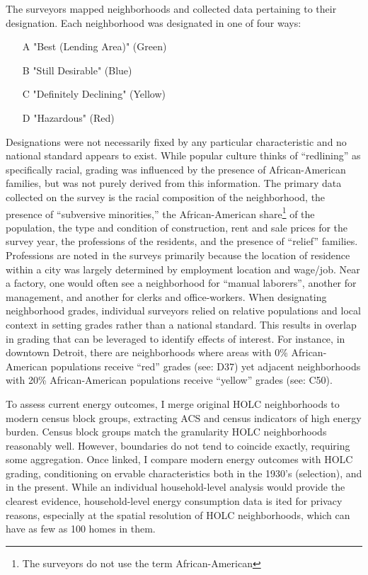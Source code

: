 \documentclass[
]{article}
\begin{document}
The surveyors mapped neighborhoods and collected data pertaining to their designation. Each neighborhood was designated in one of four ways:

\begin{itemize}
\item[A] "Best (Lending Area)" (Green)
\item[B] "Still Desirable" (Blue)
\item[C] "Definitely Declining" (Yellow)
\item[D] "Hazardous" (Red)
\end{itemize}

Designations were not necessarily fixed by any particular characteristic and no national standard appears to exist. While popular culture thinks of ``redlining'' as specifically racial, grading was influenced by the presence of African-American families, but was not purely derived from this information. The primary data collected on the survey is the racial composition of the neighborhood, the presence of ``subversive minorities,'' the African-American share\footnote{The surveyors do not use the term African-American} of the population, the type and condition of construction, rent and sale prices for the survey year, the professions of the residents, and the presence of ``relief'' families. Professions are noted in the surveys primarily because the location of residence within a city was largely determined by employment location and wage/job. Near a factory, one would often see a neighborhood for ``manual laborers'', another for management, and another for clerks and office-workers. When designating neighborhood grades, individual surveyors relied on relative populations and local context in setting grades rather than a national standard. This results in overlap in grading that can be leveraged to identify effects of interest. For instance, in downtown Detroit, there are neighborhoods where areas with 0\% African-American populations receive ``red'' grades (see: D37) yet adjacent neighborhoods with 20\% African-American populations receive ``yellow'' grades (see: C50).

To assess current energy outcomes, I merge original HOLC neighborhoods to modern census block groups, extracting ACS and census indicators of high energy burden. Census block groups match the granularity HOLC neighborhoods reasonably well. However, boundaries do not tend to coincide exactly, requiring some aggregation. Once linked, I compare modern energy outcomes with HOLC grading, conditioning on ervable characteristics both in the 1930's (selection), and in the present. While an individual household-level analysis would provide the clearest evidence, household-level energy consumption data is ited for privacy reasons, especially at the spatial resolution of HOLC neighborhoods, which can have as few as 100 homes in them.
\end{document}
